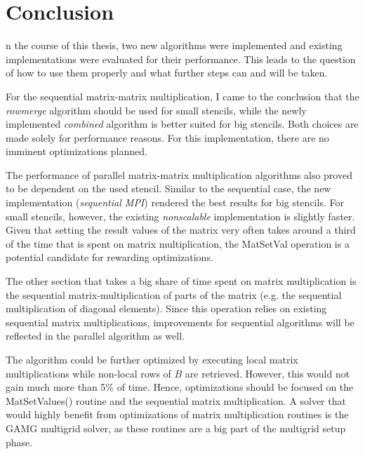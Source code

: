 \chapter*{Conclusion}

n the course of this thesis, two new algorithms were implemented and existing implementations were evaluated for their performance. This leads to the question of how to use them properly and what further steps can and will be taken. 

For the sequential matrix-matrix multiplication, I came to the conclusion that the \textit{rowmerge} algorithm should be used for small stencils, while the newly implemented \textit{combined} algorithm is better suited for big stencils. Both choices are made solely for performance reasons. For this implementation, there are no imminent optimizations planned. 

The performance of parallel matrix-matrix multiplication algorithms also proved to be dependent on the used stencil. Similar to the sequential case, the new implementation (\textit{sequential MPI}) rendered the best results for big stencils. %
For small stencils, however, the existing \textit{nonscalable} implementation is slightly faster. Given that setting the result values of the matrix very often takes around a third of the time that is spent on matrix multiplication, the MatSetVal operation is a potential candidate for rewarding optimizations. 

The other section that takes a big share of time spent on matrix multiplication is the sequential matrix-multiplication of parts of the matrix (e.g. the sequential multiplication of diagonal elements). Since this operation relies on existing sequential matrix multiplications, improvements for sequential algorithms will be reflected in the parallel algorithm as well.

The algorithm could be further optimized by executing local matrix multiplications while non-local rows of $B$ are retrieved. However, this would not gain much more than 5\% of time. Hence, optimizations should be focused on the MatSetValues() routine and the sequential matrix multiplication. A solver that would highly benefit from optimizations of matrix multiplication routines is the GAMG multigrid solver, as these routines are a big part of the multigrid setup phase.